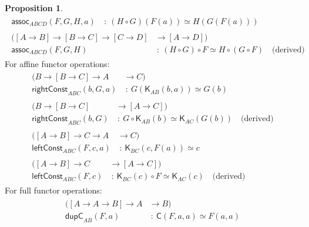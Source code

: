 \documentclass[a4paper]{article}
\theoremstyle{definition}
\newtheorem{proposition}[definition]{Proposition}
\theoremstyle{remark}
\renewcommand{\equiv}{\simeq}
\newcommand{\nm}{\mathsf}
\newcommand{\combinator}{\nm}
\newcommand{\constFun}{\combinator{K}}
\newcommand{\swapFun}{\combinator{C}}
\begin{document}
\begin{proposition}
\begin{gather*}
\begin{aligned}
      \nm{assoc}_{ABCD}(F,G,H,a)                                   &\ :\  (H \circ G)(F(a)) \equiv H(G(F(a)))
    \end{aligned}\\[1ex]
    \begin{aligned}
                      ([A \to B] \to [B \to C] \to [C \to D] &\to   [A \to D])\\
      \nm{assoc}_{ABCD}(F,G,H)                               &\ :\  (H \circ G) \circ F \equiv H \circ (G \circ F)
      \quad\text{(derived)}
    \end{aligned}
  \end{gather*}
  For affine functor operations:
  \begin{gather*}
    \begin{aligned}
                          (B \to [B \to C] \to A &\to   C)\\
      \nm{rightConst}_{ABC}(b,G,a)               &\ :\  G(\constFun_{AB}(b,a)) \equiv G(b)
    \end{aligned}\\[1ex]
    \begin{aligned}
                          (B \to [B \to C] &\to   [A \to C])\\
      \nm{rightConst}_{ABC}(b,G)           &\ :\  G \circ \constFun_{AB}(b) \equiv \constFun_{AC}(G(b))
      \quad\text{(derived)}
    \end{aligned}\\[1ex]
    \begin{aligned}
                         ([A \to B] \to C \to A &\to   C)\\
      \nm{leftConst}_{ABC}(F,c,a)               &\ :\  \constFun_{BC}(c,F(a)) \equiv c
    \end{aligned}\\[1ex]
    \begin{aligned}
                         ([A \to B] \to C &\to   [A \to C])\\
      \nm{leftConst}_{ABC}(F,c)           &\ :\  \constFun_{BC}(c) \circ F \equiv \constFun_{AC}(c)
      \quad\text{(derived)}
    \end{aligned}
  \end{gather*}
  For full functor operations:
  \begin{gather*}
    \begin{aligned}
                   ([A \to A \to B] \to A &\to   B)\\
      \nm{dupC}_{AB}(F,a)                 &\ :\  \swapFun(F,a,a) \equiv F(a,a)
    \end{aligned}\\[1ex]

\end{gather*}
\end{proposition}
\end{document}

